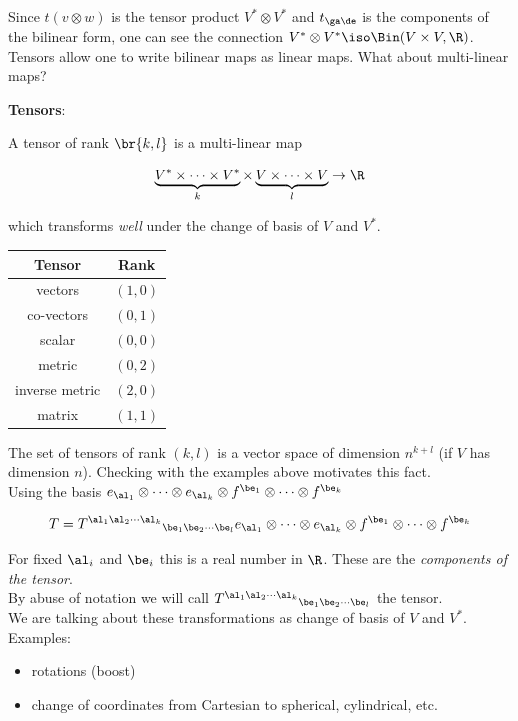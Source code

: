 \documentclass{article}
\newcommand{\heading}[1]{\vspace{0.1in}\textbf{#1}:}
\begin{document}
Since $t (v \otimes w)$ is the tensor product $V^* \otimes V^*$ and $t_{\ga\de}$ is the components of the bilinear form, one can see the connection $V^* \otimes V^* \iso \Bin(V \times V, \R)$. \\

Tensors allow one to write bilinear maps as linear maps. What about multi-linear maps?

\heading{Tensors}

A tensor of rank $\br{k,l}$ is a multi-linear map

\[ \underbrace{V^* \times \cdots \times V^*}_{k} \times \underbrace{V \times \cdots \times V}_{l} \to \R \]

which transforms \textit{well} under the change of basis of $V$ and $V^*$. \\

\begin{center}
\label{Tensor Examples}
\begin{tabular}{c|c}
Tensor & Rank \\
\hline
vectors & $(1,0)$ \\
co-vectors & $(0,1)$ \\
scalar & $(0,0)$ \\
metric & $(0,2)$ \\
inverse metric & $(2,0)$ \\
matrix & $(1,1)$ \\
\end{tabular}
\end{center}

The set of tensors of rank $(k,l)$ is a vector space of dimension $n^{k+l}$ (if $V$ has dimension $n$). Checking with the examples above motivates this fact. \\

Using the basis $e_{\al_1} \otimes \cdots \otimes e_{\al_k} \otimes f^{\be_1} \otimes \cdots \otimes f^{\be_k}$

\[ T = {T^{\al_1\al_2\cdots\al_k}}_{\be_1\be_2\cdots\be_l} e_{\al_1} \otimes \cdots \otimes e_{\al_k} \otimes f^{\be_1} \otimes \cdots \otimes f^{\be_k}\]

For fixed $\al_i$ and $\be_i$ this is a real number in $\R$. These are the \textit{components of the tensor}. \\

By abuse of notation we will call ${T^{\al_1\al_2\cdots\al_k}}_{\be_1\be_2\cdots\be_l}$ the tensor. \\

We are talking about these transformations as change of basis of $V$ and $V^*$. Examples:
\begin{itemize}
  \item rotations (boost)
  \item change of coordinates from Cartesian to spherical, cylindrical, etc.
\end{itemize}
\end{document}
